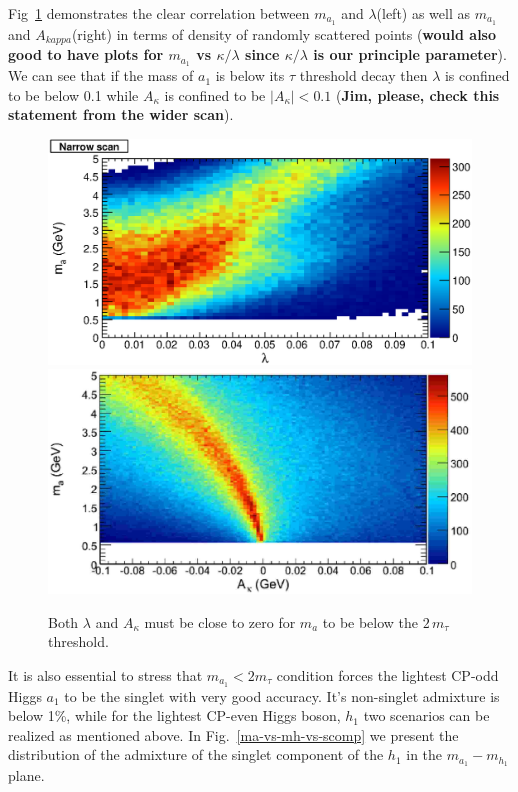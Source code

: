 \documentclass[aps,12pt,superscriptaddress,nofootinbib,floatfix,showpacs]{revtex4}
\begin{document}
Fig~\ref{pmass1_Akappa} demonstrates the clear correlation between
$m_{a_1}$ and $\lambda$(left)
as well as 
$m_{a_1}$ and $A_{kappa}$(right)
in terms of density of randomly scattered points
({\bf would also good to have plots for $m_{a_1}$ vs $\kappa/\lambda$
     since  $\kappa/\lambda$ is our principle parameter}).
We can see that if the mass of $a_1$ is  below its $\tau$ threshold decay 
then $\lambda$ is confined to be  below 0.1
while $A_\kappa$ is confined to be $|A_\kappa|<0.1$
({\bf Jim, please,  check this statement from the wider scan}).
\begin{figure}[htb]
\begin{center}
\includegraphics[width=0.5\linewidth]{plots/pmass1_lambda.eps}%
\includegraphics[width=0.5\linewidth]{plots/ma_vs_a-kappa.eps}

\caption{Both $\lambda$ and $A_\kappa$ must be close to zero for $m_a$
  to be below the $2 \, m_\tau$ threshold. \label{pmass1_Akappa}}
\end{center}
\end{figure}

It is also essential to stress that $m_{a_1}<2m_\tau$
condition forces the lightest CP-odd Higgs $a_1$ to be
the singlet with very good accuracy. It's non-singlet admixture is
below 1\%, while for the lightest CP-even Higgs boson, $h_1$
two scenarios can be realized as mentioned above.
In Fig.~\ref{ma-vs-mh-vs-scomp}
we present the distribution of the admixture of the singlet component of  the
$h_1$ in the $m_{a_1}-m_{h_1}$ plane.
\end{document}

